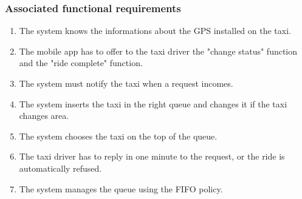 \subsubsection{Associated functional requirements}
\begin{enumerate}
\item The system knows the informations about the GPS installed on the taxi.
\item The mobile app has to offer to the taxi driver the "change status" function and the "ride complete" function.
\item The system must notify the taxi when a request incomes.
\item The system inserts the taxi in the right queue and changes it if the taxi changes area.
\item The system chooses the taxi on the top of the queue.
\item The taxi driver has to reply in one minute to the request, or the ride is automatically refused.
\item The system manages the queue using the FIFO policy.
\end{enumerate}